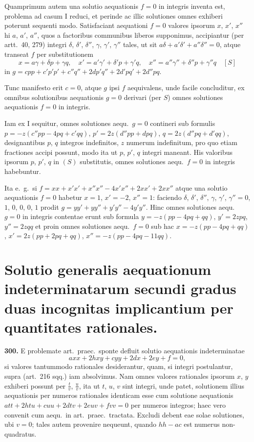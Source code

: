 \documentclass[12pt,a4paper]{article}
\theoremstyle{plain}
\theoremstyle{definition}
\theoremstyle{remark}
\begin{document}
Quamprimum autem una solutio aequationis $f = 0$ in integris inventa est, problema ad casum I reduci, et perinde ac illic solutiones omnes exhiberi poterunt sequenti modo. Satisfaciant aequationi $f = 0$ valores ipsorum $x$, $x'$, $x''$ hi $a$, $a'$, $a''$, quos a factoribus communibus liberos supponimus, accipiantur (per artt.~40, 279) integri $\delta$, $\delta'$, $\delta''$, $\gamma$, $\gamma'$, $\gamma''$ tales, ut sit $a\delta + a'\delta' + a''\delta'' = 0$, atque transeat $f$ per substitutionem
\[
x = a\gamma + \delta p + \gamma q,\quad x' = a'\gamma' + \delta' p + \gamma' q,\quad x'' = a''\gamma'' + \delta'' p + \gamma'' q \quad [S]
\]
in $g = cpp + c'p'p' + c''q'' + 2dp'q'' + 2d'pq' + 2d''pq$.

Tunc manifesto erit $c = 0$, atque $g$ ipsi $f$ aequivalens, unde facile concluditur, ex omnibus solutionibus aequationis $g = 0$ derivari (per $S$) omnes solutiones aequationis $f = 0$ in integris.

Iam ex I sequitur, omnes solutiones aequ.~$g = 0$ contineri sub formulis $p = -z(c''pp - 4pq + c'qq)$, $p' = 2z(d''pp + dpq)$, $q = 2z(d''pq + d'qq)$, designantibus $p$, $q$ integros indefinitos, $z$ numerum indefinitum, pro quo etiam fractiones accipi possunt, modo ita ut $p$, $p'$, $q$ integri maneant. His valoribus ipsorum $p$, $p'$, $q$ in $(S)$ substitutis, omnes solutiones aequ.~$f = 0$ in integris habebuntur.

Ita e.~g.~si $f = xx + x'x' + x''x'' - 4x'x'' + 2xx' + 2xx''$ atque una solutio aequationis $f = 0$ habetur $x = 1$, $x' = -2$, $x'' = 1$: faciendo $\delta$, $\delta'$, $\delta''$, $\gamma$, $\gamma'$, $\gamma'' = 0$, $1$, $0$, $0$, $0$, $1$ prodit $g = yy' + yy'' + y'y'' - 4y'y''$. Hinc omnes solutiones aequ.~$g = 0$ in integris contentae erunt sub formula $y = -z(pp - 4pq + qq)$, $y' = 2zpq$, $y'' = 2zqq$ et proin omnes solutiones aequ.~$f = 0$ sub hac $x = -z(pp - 4pq + qq)$, $x' = 2z(pp + 2pq + qq)$, $x'' = -z(pp - 4pq - 11qq)$.

\section*{Solutio generalis aequationum indeterminatarum secundi gradus duas incognitas implicantium per quantitates rationales.}

\textbf{300.} E problemate art.~praec.~sponte defluit solutio aequationis indeterminatae
\[
axx + 2hxy + cyy + 2dx + 2ey + f = 0,
\]
si valores tantummodo rationales desiderantur, quam, si integri postulantur, supra (art.~216 sqq.) iam absolvimus. Nam omnes valores rationales ipsorum $x$, $y$ exhiberi possunt per $\tfrac{t}{v}$, $\tfrac{u}{v}$, ita ut $t$, $u$, $v$ sint integri, unde patet, solutionem illius aequationis per numeros rationales identicam esse cum solutione aequationis $att + 2htu + cuu + 2dtv + 2euv + fvv = 0$ per numeros integros; haec vero convenit cum aequ.~in art.~praec.~tractata. Excludi debent eae solae solutiones, ubi $v = 0$; tales autem provenire nequeunt, quando $hh - ac$ est numerus non-quadratus.
\end{document}
